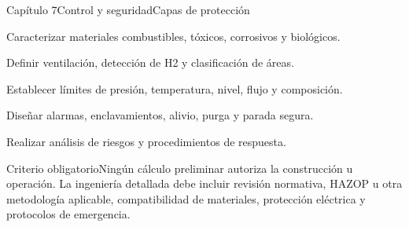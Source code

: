 \begin{HVTPage}{Capítulo 7}{Control y seguridad}{Capas de protección}
\begin{HVTSteps}\item Caracterizar materiales combustibles, tóxicos, corrosivos y biológicos. \item Definir ventilación, detección de H2 y clasificación de áreas. \item Establecer límites de presión, temperatura, nivel, flujo y composición. \item Diseñar alarmas, enclavamientos, alivio, purga y parada segura. \item Realizar análisis de riesgos y procedimientos de respuesta.\end{HVTSteps}
\begin{HVTWarning}{Criterio obligatorio}Ningún cálculo preliminar autoriza la construcción u operación. La ingeniería detallada debe incluir revisión normativa, HAZOP u otra metodología aplicable, compatibilidad de materiales, protección eléctrica y protocolos de emergencia.\end{HVTWarning}
\end{HVTPage}
